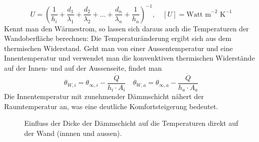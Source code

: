 \begin{equation}
\boxed{U=\left(\dfrac{1}{h_i}+\dfrac{d_1}{\lambda_1}+\dfrac{d_2}{\lambda_2}+\dotso+\dfrac{d_n}{\lambda_n}+\dfrac{1}{h_a}\right)^{-1},\quad [U]=\text{Watt m}^{-2}\text{ K}^{-1}}
\end{equation}
Kennt man den Wärmestrom, so lassen sich daraus auch die Temperaturen der Wandoberfläche berechnen: Die Temperaturänderung ergibt sich aus dem thermischen Widerstand. Geht man von einer Aussentemperatur und eine Innentemperatur und verwendet man die konvenktiven thermischen Widerstände auf der Innen- und auf der Aussenseite, findet man
\begin{equation}
\boxed{\theta_{W,i}=\theta_{\infty, i}-\dfrac{\dot{Q}}{h_i\cdot A_i}}\quad \boxed{\theta_{W,a}=\theta_{\infty, a}-\dfrac{\dot{Q}}{h_a\cdot A_a}}
\end{equation}
Die Innentemperatur mit zunehmender Dämmschicht nähert der Raumtemperatur an, was eine deutliche Komfortsteigerung bedeutet.
\begin{figure}[H]
\centering
\caption{Einfluss der Dicke der Dämmschicht auf die Temperaturen direkt auf der Wand (innnen und aussen).}
\label{fig_Ip}
\end{figure}
